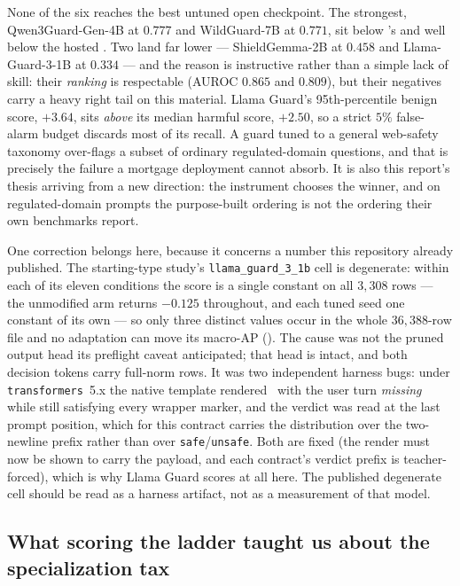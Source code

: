 \documentclass[11pt]{article}
\newcommand{\code}[1]{\texttt{\small #1}}
\begin{document}
None of the six reaches the best untuned open checkpoint. The strongest,
Qwen3Guard-Gen-4B at $0.777$ and WildGuard-7B at $0.771$, sit below
\FrontierBestOpenName's \FrontierBestOpenTpr{} and well below the hosted
\FrontierBestTpr. Two land far lower --- ShieldGemma-2B at $0.458$ and Llama-Guard-3-1B at
$0.334$ --- and the reason is instructive rather than a simple lack of skill: their
\emph{ranking} is respectable (AUROC $0.865$ and $0.809$), but their negatives carry a heavy
right tail on this material. Llama Guard's 95th-percentile benign score, $+3.64$, sits
\emph{above} its median harmful score, $+2.50$, so a strict $5\%$ false-alarm budget discards
most of its recall. A guard tuned to a general web-safety taxonomy over-flags a subset of
ordinary regulated-domain questions, and that is precisely the failure a mortgage deployment
cannot absorb. It is also this report's thesis arriving from a new direction: the instrument
chooses the winner, and on regulated-domain prompts the purpose-built ordering is not the
ordering their own benchmarks report.

\label{sec:llama-guard-harness}%
One correction belongs here, because it concerns a number this repository already published.
The starting-type study's \code{llama\_guard\_3\_1b} cell is degenerate: within each of its eleven
conditions the score is a single constant on all $3{,}308$ rows --- the unmodified arm returns
$-0.125$ throughout, and each tuned seed one constant of its own --- so only three distinct values
occur in the whole $36{,}388$-row file and no adaptation can move its macro-AP
(). The cause
was not the pruned output head its preflight caveat anticipated; that head is intact, and both
decision tokens carry full-norm rows. It was two independent harness bugs: under
\code{transformers}~5.x the native template rendered
\code{<BEGIN CONVERSATION>}\,\code{<END CONVERSATION>} with the user turn \emph{missing} while
still satisfying every wrapper marker, and the verdict was read at the last prompt position,
which for this contract carries the distribution over the two-newline prefix rather than over
\code{safe}/\code{unsafe}. Both are fixed (the render must now be shown to carry the payload,
and each contract's verdict prefix is teacher-forced), which is why Llama Guard scores at all
here. The published degenerate cell should be read as a harness artifact, not as a measurement
of that model.


\subsection{What scoring the ladder taught us about the specialization tax}
\label{sec:frontier-ladder}
\end{document}
